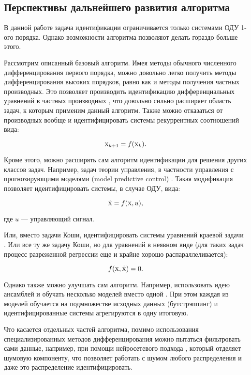 \subsection{Перспективы дальнейшего развития алгоритма}

В данной работе задача идентификации ограничивается только системами ОДУ 1-ого порядка. Однако возможности алгоритма позволяют делать гораздо больше этого.

Рассмотрим описанный базовый алгоритм. Имея методы обычного численного дифференцирования первого порядка, можно довольно легко получить методы дифференцирования высоких порядков, равно как и методы получения частных производных. Это позволяет производить идентификацию дифференциальных уравнений в частных производных \cite{sindy}, что довольно сильно расширяет область задач, к которым применим данный алгоритм. Также можно отказаться от производных вообще и идентифицировать системы рекуррентных соотношений \cite{sindy} вида:

\begin{equation}
\textsc{x}_{k+1} = f(\textsc{x}_k).
\end{equation}

Кроме этого, можно расширять сам алгоритм идентификации для решения других классов задач. Например, задач теории управления, в частности управления с прогнозирующими моделями (model predictive control) \cite{sindyc_1, sindyc_2}. Такая модификация позволяет идентифицировать системы, в случае ОДУ, вида:

\begin{equation}
\dot{\textsc{x}} = f(\textsc{x}, u),
\end{equation}

где $u$ --- управляющий сигнал.

Или, вместо задачи Коши, идентифицировать системы уравнений краевой задачи \cite{sindy-bvp}. Или все ту же задачу Коши, но для уравнений в неявном виде \cite{sindy-pi} (для таких задач процесс разреженной регрессии еще и крайне хорошо распараллеливается):

\begin{equation}
f(\textsc{x}, \dot{\textsc{x}}) = 0.
\end{equation}

Однако также можно улучшать сам алгоритм. Например, использовать идею ансамблей и обучать несколько моделей вместо одной \cite{sindy-ensemble}. При этом каждая из моделей обучается на подмножестве исходных данных (бутстрэппинг) и идентифицированные системы агрегируются в одну итоговую.

Что касается отдельных частей алгоритма, помимо использования специализированных методов дифференцирования можно пытаться фильтровать сами данные, например, при помощи нейросетевого подхода \cite{nn_denoise}, который отделяет шумовую компоненту, что позволяет работать с шумом любого распределения и даже это распределение идентифицировать.
